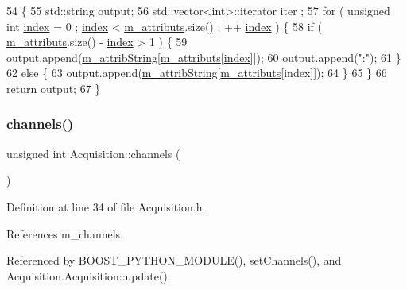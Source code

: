 \begin{DoxyCode}
54                             \{
55   std::string output;
56   std::vector<int>::iterator iter ;
57   \textcolor{keywordflow}{for} ( \textcolor{keywordtype}{unsigned} \textcolor{keywordtype}{int} \hyperlink{namespaceimages_a54407fd574970b3178647ae096321a57}{index} = 0 ; \hyperlink{namespaceimages_a54407fd574970b3178647ae096321a57}{index} < \hyperlink{classAttrib_ac4bd58a0cc6b38a3b711d609a3d3aacc}{m\_attributs}.size() ; ++
      \hyperlink{namespaceimages_a54407fd574970b3178647ae096321a57}{index} ) \{
58     \textcolor{keywordflow}{if} ( \hyperlink{classAttrib_ac4bd58a0cc6b38a3b711d609a3d3aacc}{m\_attributs}.size() - \hyperlink{namespaceimages_a54407fd574970b3178647ae096321a57}{index} > 1 ) \{
59       output.append(\hyperlink{classAttrib_a3414521d7a82476e874b25a5407b5e63}{m\_attribString}[\hyperlink{classAttrib_ac4bd58a0cc6b38a3b711d609a3d3aacc}{m\_attributs}[\hyperlink{namespaceimages_a54407fd574970b3178647ae096321a57}{index}]]);
60       output.append(\textcolor{stringliteral}{":"});
61     \}
62     \textcolor{keywordflow}{else} \{
63       output.append(\hyperlink{classAttrib_a3414521d7a82476e874b25a5407b5e63}{m\_attribString}[\hyperlink{classAttrib_ac4bd58a0cc6b38a3b711d609a3d3aacc}{m\_attributs}[index]]);
64     \}
65   \}
66   \textcolor{keywordflow}{return} output;
67 \}
\end{DoxyCode}
\mbox{\label{classAcquisition_a3041537afcb4dfe5c6940f0ef6829265}} 
\subsubsection{\texorpdfstring{channels()}{channels()}}
{\footnotesize\ttfamily unsigned int Acquisition\+::channels (\begin{DoxyParamCaption}{ }\end{DoxyParamCaption})\hspace{0.3cm}{\ttfamily [inline]}}



Definition at line 34 of file Acquisition.\+h.



References m\+\_\+channels.



Referenced by B\+O\+O\+S\+T\+\_\+\+P\+Y\+T\+H\+O\+N\+\_\+\+M\+O\+D\+U\+L\+E(), set\+Channels(), and Acquisition.\+Acquisition\+::update().


